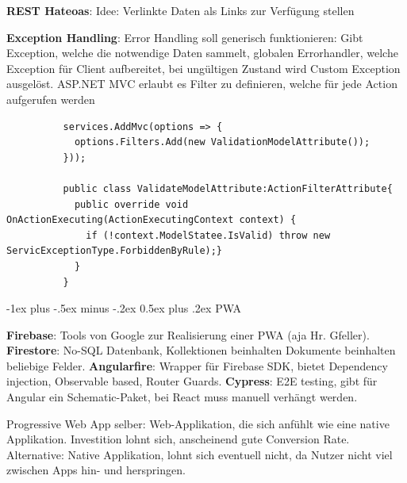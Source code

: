 \documentclass[10pt,landscape]{article}
\makeatletter
\renewcommand{\section}{\@startsection{section}{1}{0mm}%
{-1ex plus -.5ex minus -.2ex}%
{0.5ex plus .2ex}%
{\normalfont\large\bfseries}}
\makeatother
\begin{document}
\begin{multicols}{2}
        \textbf{REST Hateoas}: Idee: Verlinkte Daten als Links zur Verfügung stellen 

        \textbf{Exception Handling}: Error Handling soll generisch funktionieren: Gibt Exception, welche die notwendige Daten sammelt, globalen Errorhandler, welche Exception für Client aufbereitet, bei ungültigen Zustand wird Custom Exception ausgelöst.
        ASP.NET MVC erlaubt es Filter zu definieren, welche für jede Action aufgerufen werden 
        \begin{lstlisting}
          services.AddMvc(options => {
            options.Filters.Add(new ValidationModelAttribute());
          }));

          public class ValidateModelAttribute:ActionFilterAttribute{
            public override void OnActionExecuting(ActionExecutingContext context) {
              if (!context.ModelStatee.IsValid) throw new ServicExceptionType.ForbiddenByRule);}
            }
          }
        \end{lstlisting}
        
      

        \section{PWA}

        \textbf{Firebase}: Tools von Google zur Realisierung einer PWA (aja Hr. Gfeller).
        \textbf{Firestore}: No-SQL Datenbank, Kollektionen beinhalten Dokumente beinhalten beliebige Felder.
        \textbf{Angularfire}: Wrapper für Firebase SDK, bietet Dependency injection, Observable based, Router Guards.
        \textbf{Cypress}: E2E testing, gibt für Angular ein Schematic-Paket, bei React muss manuell verhängt werden.

        Progressive Web App selber: Web-Applikation, die sich anfühlt wie eine native Applikation.
        Investition lohnt sich, anscheinend gute Conversion Rate.
        Alternative: Native Applikation, lohnt sich eventuell nicht, da Nutzer nicht viel zwischen Apps hin- und herspringen.


\end{multicols}
\end{document}
